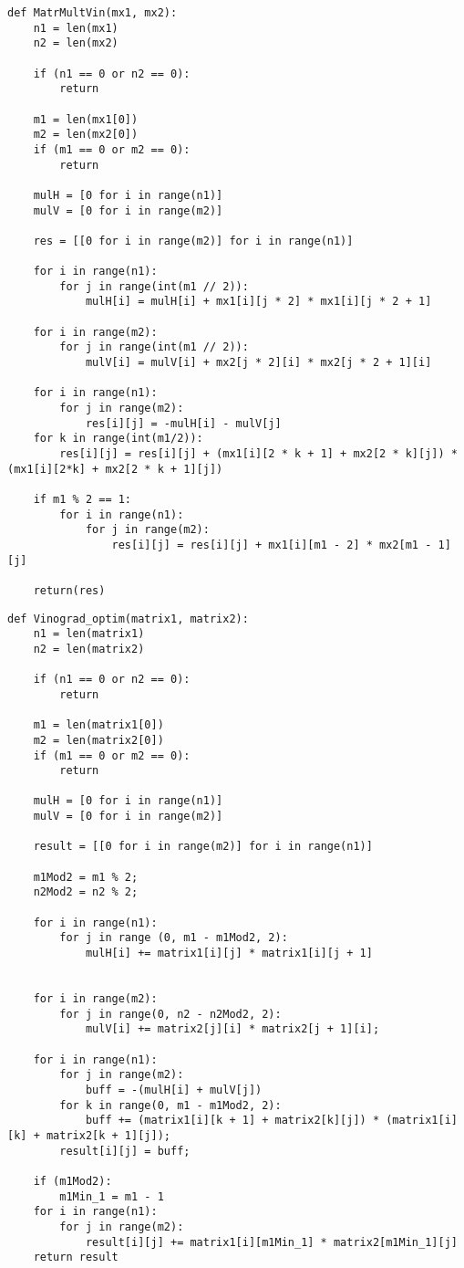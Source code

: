 \documentclass[12pt]{report}
\begin{document}
\begin{lstlisting}[label=some-code,caption=Алгоритм Винограда]
def MatrMultVin(mx1, mx2):
	n1 = len(mx1)
	n2 = len(mx2)
	
	if (n1 == 0 or n2 == 0):
		return
	
	m1 = len(mx1[0])
	m2 = len(mx2[0])
	if (m1 == 0 or m2 == 0):
		return
	
	mulH = [0 for i in range(n1)]
	mulV = [0 for i in range(m2)]
	
	res = [[0 for i in range(m2)] for i in range(n1)]
	
	for i in range(n1):
		for j in range(int(m1 // 2)):
			mulH[i] = mulH[i] + mx1[i][j * 2] * mx1[i][j * 2 + 1]
	
	for i in range(m2):
		for j in range(int(m1 // 2)):
			mulV[i] = mulV[i] + mx2[j * 2][i] * mx2[j * 2 + 1][i]
	
	for i in range(n1):
		for j in range(m2):
			res[i][j] = -mulH[i] - mulV[j]
	for k in range(int(m1/2)):
		res[i][j] = res[i][j] + (mx1[i][2 * k + 1] + mx2[2 * k][j]) * (mx1[i][2*k] + mx2[2 * k + 1][j])
	
	if m1 % 2 == 1:
		for i in range(n1):
			for j in range(m2):
				res[i][j] = res[i][j] + mx1[i][m1 - 2] * mx2[m1 - 1][j]
	
	return(res)
\end{lstlisting}


\begin{lstlisting}[label=some-code,caption=Оптимизированный алгоритм Винограда]
def Vinograd_optim(matrix1, matrix2):
	n1 = len(matrix1)
	n2 = len(matrix2)
	
	if (n1 == 0 or n2 == 0):
		return
	
	m1 = len(matrix1[0])
	m2 = len(matrix2[0])
	if (m1 == 0 or m2 == 0):
		return
	
	mulH = [0 for i in range(n1)]
	mulV = [0 for i in range(m2)]
	
	result = [[0 for i in range(m2)] for i in range(n1)]
	
	m1Mod2 = m1 % 2;
	n2Mod2 = n2 % 2;
	
	for i in range(n1):
		for j in range (0, m1 - m1Mod2, 2):
			mulH[i] += matrix1[i][j] * matrix1[i][j + 1]
	
	
	for i in range(m2):
		for j in range(0, n2 - n2Mod2, 2):
			mulV[i] += matrix2[j][i] * matrix2[j + 1][i];
	
	for i in range(n1):
		for j in range(m2):
			buff = -(mulH[i] + mulV[j])
		for k in range(0, m1 - m1Mod2, 2):
			buff += (matrix1[i][k + 1] + matrix2[k][j]) * (matrix1[i][k] + matrix2[k + 1][j]);
		result[i][j] = buff;
	
	if (m1Mod2):
		m1Min_1 = m1 - 1
	for i in range(n1):
		for j in range(m2):
			result[i][j] += matrix1[i][m1Min_1]	* matrix2[m1Min_1][j]
	return result
\end{lstlisting}
\end{document}
